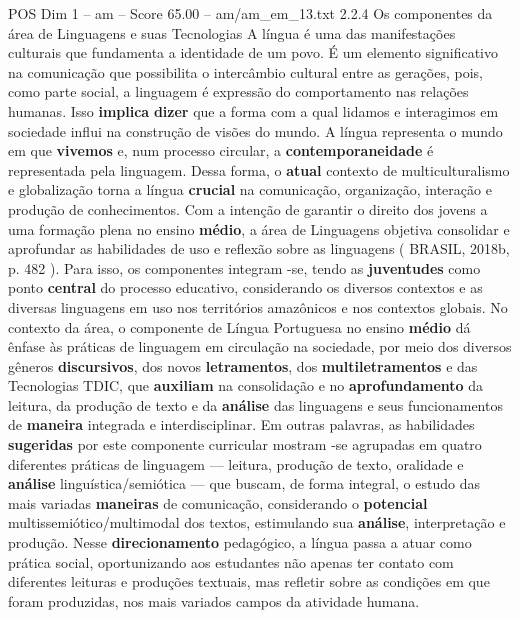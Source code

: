 \begin{textsample}{POS Dim 1 – am – Score 65.00 – am/am\_em\_13.txt}  \label{ex:f1_pos_222}
2.2.4 Os componentes da área de Linguagens e suas Tecnologias A língua é uma das manifestações culturais que fundamenta a identidade de um povo.
É um elemento significativo na comunicação que possibilita o intercâmbio cultural entre as gerações, pois, como parte social, a linguagem é expressão do comportamento nas relações humanas.
Isso \textbf{implica} \textbf{dizer} que a forma com a qual lidamos e interagimos em sociedade influi na construção de visões do mundo.
A língua representa o mundo em que \textbf{vivemos} e, num processo circular, a \textbf{contemporaneidade} é representada pela linguagem.
Dessa forma, o \textbf{atual} contexto de multiculturalismo e globalização torna a língua \textbf{crucial} na comunicação, organização, interação e produção de conhecimentos.
Com a intenção de garantir o direito dos jovens a uma formação plena no ensino \textbf{médio}, a área de Linguagens objetiva consolidar e aprofundar as habilidades de uso e reflexão sobre as linguagens ( BRASIL, 2018b, p. 482 ).
Para isso, os componentes integram -se, tendo as \textbf{juventudes} como ponto \textbf{central} do processo educativo, considerando os diversos contextos e as diversas linguagens em uso nos territórios amazônicos e nos contextos globais.
No contexto da área, o componente de Língua Portuguesa no ensino \textbf{médio} dá ênfase às práticas de linguagem em circulação na sociedade, por meio dos diversos gêneros \textbf{discursivos}, dos novos \textbf{letramentos}, dos \textbf{multiletramentos} e das Tecnologias TDIC, que \textbf{auxiliam} na consolidação e no \textbf{aprofundamento} da leitura, da produção de texto e da \textbf{análise} das linguagens e seus funcionamentos de \textbf{maneira} integrada e interdisciplinar.
Em outras palavras, as habilidades \textbf{sugeridas} por este componente curricular mostram -se agrupadas em quatro diferentes práticas de linguagem — leitura, produção de texto, oralidade e \textbf{análise} linguística/semiótica — que buscam, de forma integral, o estudo das mais variadas \textbf{maneiras} de comunicação, considerando o \textbf{potencial} multissemiótico/multimodal dos textos, estimulando sua \textbf{análise}, interpretação e produção.
Nesse \textbf{direcionamento} pedagógico, a língua passa a atuar como prática social, oportunizando aos estudantes não apenas ter contato com diferentes leituras e produções textuais, mas refletir sobre as condições em que foram produzidas, nos mais variados campos da atividade humana.

\end{textsample}
